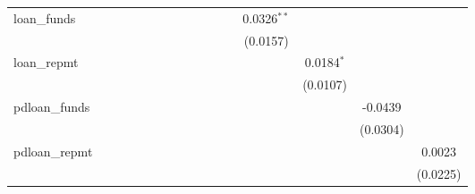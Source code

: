 \begin{table}[htbp]
\begin{tiny}
\begin{tabular}{lccccccccccccccc}
         loan\_funds             &                 &                 &                 &                 &                 &                 &                 &                 &                 &                 &                 & 0.0326$^{**}$   &                 &                 &   \\
                                  &                 &                 &                 &                 &                 &                 &                 &                 &                 &                 &                 & (0.0157)        &                 &                 &   \\
         loan\_repmt             &                 &                 &                 &                 &                 &                 &                 &                 &                 &                 &                 &                 & 0.0184$^{*}$    &                 &   \\
                                  &                 &                 &                 &                 &                 &                 &                 &                 &                 &                 &                 &                 & (0.0107)        &                 &   \\
         pdloan\_funds           &                 &                 &                 &                 &                 &                 &                 &                 &                 &                 &                 &                 &                 & -0.0439         &   \\
                                  &                 &                 &                 &                 &                 &                 &                 &                 &                 &                 &                 &                 &                 & (0.0304)        &   \\
         pdloan\_repmt           &                 &                 &                 &                 &                 &                 &                 &                 &                 &                 &                 &                 &                 &                 & 0.0023\\
                                  &                 &                 &                 &                 &                 &                 &                 &                 &                 &                 &                 &                 &                 &                 & (0.0225)\\

\end{tabular}
\end{tiny}
\end{table}
